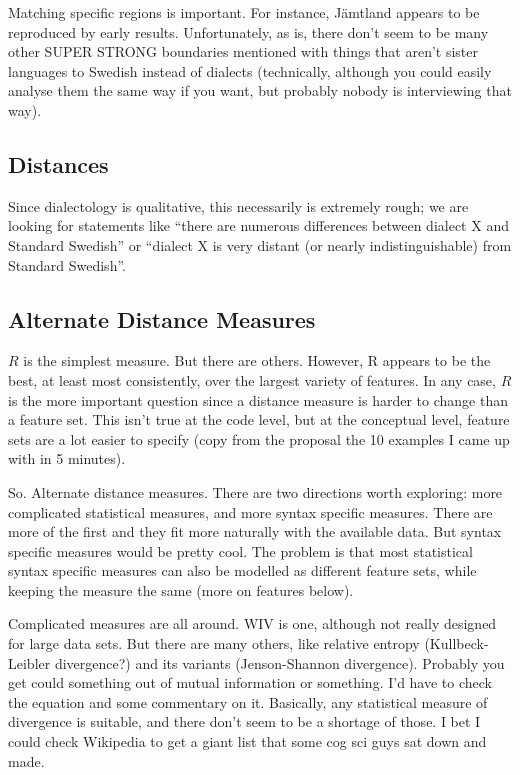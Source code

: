 Matching specific regions is important. For instance, J\"amtland
appears to be reproduced by early results. Unfortunately, as is, there
don't seem to be many other SUPER STRONG boundaries mentioned with
things that aren't sister languages to Swedish instead of dialects
(technically, although you could easily analyse them the same way if
you want, but probably nobody is interviewing that way).

\subsection{Distances}

Since dialectology is qualitative, this necessarily is extremely
rough; we are looking for statements like ``there are numerous
differences between dialect X and Standard Swedish'' or ``dialect X is
very distant (or nearly indistinguishable) from Standard Swedish''.

\subsection{Alternate Distance Measures}

$R$ is the simplest measure. But there are others. However, R appears to
be the best, at least most consistently, over the largest variety of
features. In any case, $R$ is the more important question since a
distance measure is harder to change than a feature set. This isn't
true at the code level, but at the conceptual level, feature
sets are a lot easier to specify (copy from the proposal the 10
examples I came up with in 5 minutes).

So. Alternate distance measures. There are two directions worth
exploring: more complicated statistical measures, and more syntax
specific measures. There are more of the first and they fit more
naturally with the available data. But syntax specific measures would
be pretty cool. The problem is that most statistical syntax specific
measures can also be modelled as different feature sets, while keeping
the measure the same (more on features below).

Complicated measures are all around. WIV is one, although not really
designed for large data sets. But there are many others, like relative
entropy (Kullbeck-Leibler divergence?) and its variants
(Jenson-Shannon divergence). Probably you get could something out of
mutual information or something. I'd have to check the equation and
some commentary on it. Basically, any statistical measure of
divergence is suitable, and there don't seem to be a shortage of
those. I bet I could check Wikipedia to get a giant list that some cog
sci guys sat down and made.

